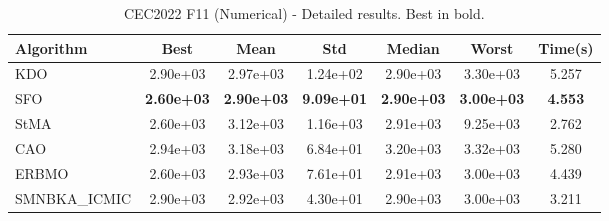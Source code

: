 \begin{table}[H]
\centering\small
\caption{CEC2022 F11 (Numerical) - Detailed results. Best in bold.}
\label{tab:cec2022_F11}
\begin{tabular}{lcccccc}
\toprule
\textbf{Algorithm} & \textbf{Best} & \textbf{Mean} & \textbf{Std} & \textbf{Median} & \textbf{Worst} & \textbf{Time(s)} \\
\midrule
KDO & 2.90e+03 & 2.97e+03 & 1.24e+02 & 2.90e+03 & 3.30e+03 & 5.257 \\
SFO & \textbf{2.60e+03} & \textbf{2.90e+03} & \textbf{9.09e+01} & \textbf{2.90e+03} & \textbf{3.00e+03} & \textbf{4.553} \\
StMA & 2.60e+03 & 3.12e+03 & 1.16e+03 & 2.91e+03 & 9.25e+03 & 2.762 \\
CAO & 2.94e+03 & 3.18e+03 & 6.84e+01 & 3.20e+03 & 3.32e+03 & 5.280 \\
ERBMO & 2.60e+03 & 2.93e+03 & 7.61e+01 & 2.91e+03 & 3.00e+03 & 4.439 \\
SMNBKA_ICMIC & 2.90e+03 & 2.92e+03 & 4.30e+01 & 2.90e+03 & 3.00e+03 & 3.211 \\
\bottomrule
\end{tabular}
\end{table}
